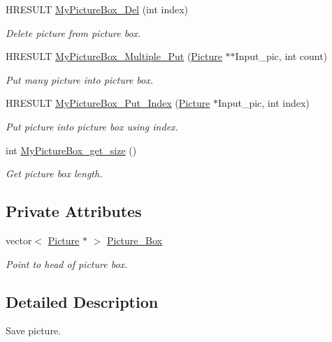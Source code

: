 \begin{DoxyCompactItemize}
H\+R\+E\+S\+U\+LT \hyperlink{class_my_picture_1_1_my_picture_box_aa730dae618986f0e6e8b70f108e2cce5}{My\+Picture\+Box\+\_\+\+Del} (int index)
\begin{DoxyCompactList}\small\item\em Delete picture from picture box. \end{DoxyCompactList}\item 
H\+R\+E\+S\+U\+LT \hyperlink{class_my_picture_1_1_my_picture_box_a86b36ade7bfa5d3e7b17ff807d6ea8ed}{My\+Picture\+Box\+\_\+\+Multiple\+\_\+\+Put} (\hyperlink{class_my_picture_1_1_picture}{Picture} $\ast$$\ast$Input\+\_\+pic, int count)
\begin{DoxyCompactList}\small\item\em Put many picture into picture box. \end{DoxyCompactList}\item 
H\+R\+E\+S\+U\+LT \hyperlink{class_my_picture_1_1_my_picture_box_a94ead24e0dc6272c16dcb7009e71b18e}{My\+Picture\+Box\+\_\+\+Put\+\_\+\+Index} (\hyperlink{class_my_picture_1_1_picture}{Picture} $\ast$Input\+\_\+pic, int index)
\begin{DoxyCompactList}\small\item\em Put picture into picture box using index. \end{DoxyCompactList}\item 
int \hyperlink{class_my_picture_1_1_my_picture_box_aa30c70751bb609cd99733a1d5f99b52e}{My\+Picture\+Box\+\_\+get\+\_\+size} ()
\begin{DoxyCompactList}\small\item\em Get picture box length. \end{DoxyCompactList}\end{DoxyCompactItemize}
\subsection*{Private Attributes}
\begin{DoxyCompactItemize}
\item 
vector$<$ \hyperlink{class_my_picture_1_1_picture}{Picture} $\ast$ $>$ \hyperlink{class_my_picture_1_1_my_picture_box_af78a5226e0dcb26d53245c7ea1c8a07d}{Picture\+\_\+\+Box}
\begin{DoxyCompactList}\small\item\em Point to head of picture box. \end{DoxyCompactList}\end{DoxyCompactItemize}


\subsection{Detailed Description}
Save picture. 



